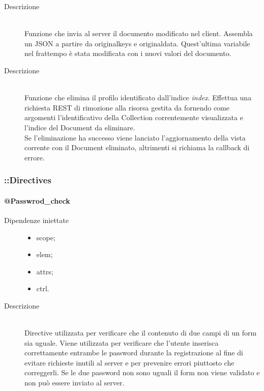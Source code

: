 \begin{description}
\begin{description}
\begin{description}
    \end{description}
 

  \item[edit\textunderscore document()] \hfill
  \begin{description}
   	\item[Descrizione] \hfill \\
  Funzione che invia al server il documento modificato nel client.
  Assembla un JSON a partire da original\textunderscore keys e original\textunderscore data. Quest'ultima variabile nel frattempo è stata modificata con i nuovi valori del documento.
    \end{description}

  \item[delete\textunderscore document()] \hfill
    \begin{description}
  	\item[Descrizione] \hfill \\ 
 Funzione che elimina il profilo identificato dall'indice \textit{index}. Effettua una richiesta REST di rimozione alla risorsa gestita da  fornendo come argomenti l'identificativo della Collection correntemente visualizzata e l'indice del Document da eliminare. \\
  Se l'eliminazione ha successo viene lanciato l'aggiornamento della vista corrente con il Document eliminato, altrimenti si richiama la callback di errore.
      \end{description}

 \end{description}
\end{description}

\subsubsection{::Directives}

\paragraph{@Passwrod\_check}
\begin{description}
\item [Dipendenze iniettate] \hfill
\begin{itemize}
	\item scope;
	\item elem;
	\item attrs;	
	\item ctrl.
\end{itemize}
 \item[Descrizione] \hfill \\
 Directive utilizzata per verificare che il contenuto di due campi di un form sia uguale.
 Viene utilizzata per verificare che l'utente inserisca correttamente entrambe le password durante la registrazione al fine di evitare richieste inutili al server e per prevenire errori piuttosto che correggerli.
 Se le due password non sono uguali il form non viene validato e non può essere inviato al server.

\end{description}



